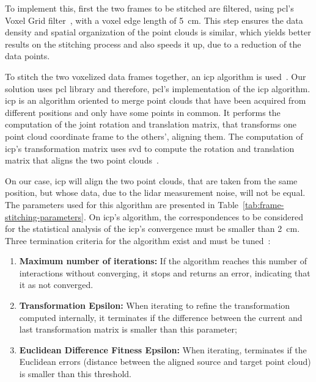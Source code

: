 To implement this, first the two frames to be stitched are filtered, using \ac{pcl}'s Voxel Grid filter~\cite{PCL}, with a voxel edge length of \SI{5}{\centi\meter}. This step ensures the data density and spatial organization of the point clouds is similar, which yields better results on the stitching process and also speeds it up, due to a reduction of the data points.

To stitch the two voxelized data frames together, an \ac{icp} algorithm is used~\cite{Rusinkiewicz2001}. Our solution uses \ac{pcl} library and therefore, \ac{pcl}'s implementation of the \ac{icp} algorithm. \ac{icp} is an algorithm oriented to merge point clouds that have been acquired from different positions and only have some points in common. It performs the computation of the joint rotation and translation matrix, that transforms one point cloud coordinate frame to the others', aligning them. The computation of \ac{icp}'s transformation matrix uses \ac{svd} to compute the rotation and translation matrix that aligns the two point clouds~\cite{SVD, mvg_book}.

On our case, \ac{icp} will align the two point clouds, that are taken from the same position, but whose data, due to the \ac{lidar} measurement noise, will not be equal. The parameters used for this algorithm are presented in Table~\ref{tab:frame-stitching-parameters}. On \ac{icp}'s algorithm, the correspondences to be considered for the statistical analysis of the \ac{icp}'s convergence must be smaller than \SI{2}{\centi\meter}. Three termination criteria for the algorithm exist and must be tuned~\cite{PCL}:

\begin{enumerate}
\item \textbf{Maximum number of iterations:} If the algorithm reaches this number of interactions without converging, it stops and returns an error, indicating that it as not converged.
\item \textbf{Transformation Epsilon:} When iterating to refine the transformation computed internally, it terminates if the difference between the current and last transformation matrix is smaller than this parameter;
\item \textbf{Euclidean Difference Fitness Epsilon:} When iterating, terminates if the Euclidean errors (distance between the aligned source and target point cloud) is smaller than this threshold.
\end{enumerate}


